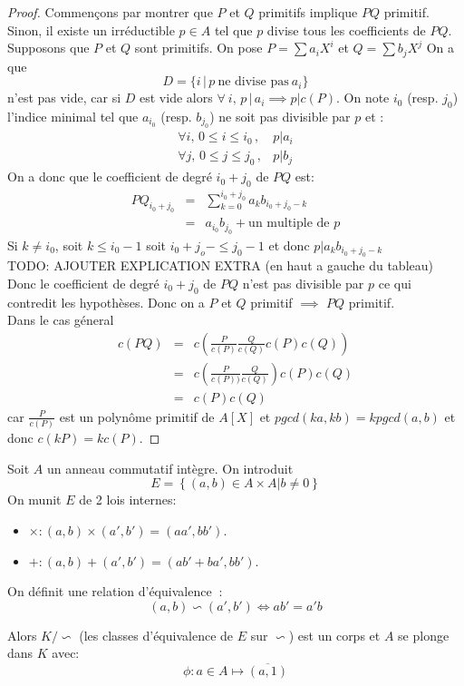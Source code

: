 \begin{proof}
	Commençons par montrer que $P$ et $Q$ primitifs implique $PQ$ primitif. \\
	Sinon, il existe un irréductible $p \in A $ tel que $p$ divise tous les coefficients de $PQ$. \\

	Supposons que $P$ et $Q$ sont primitifs. On pose $P = \sum a_iX^i$ et  $Q = \sum b_jX^j$
	On a que $$D = \{i \,|\, p\  \text{ne divise pas}\  a_i \}$$ n'est pas vide, car si $D$ est vide alors $ \forall\  i,\, p \,|\, a_i \implies p | c(P)$.
	On note $i_0$ (resp. $j_0$) l'indice minimal tel que $a_{i_0}$ (resp. $b_{j_0}$) ne soit pas divisible par $p$ et :
	\begin{eqnarray*}
		\forall i, \, 0 \leq i \leq i_0\,,& p | a_i \\
		\forall j, \, 0 \leq j \leq j_0\,,& p | b_j
	\end{eqnarray*}
	On a donc que le coefficient de degré $i_0 + j_0$ de $PQ$ est:
	\begin{eqnarray*}
		PQ_{i_0+j_0}&=& \sum\limits^{i_0 + j_0}_{k=0} a_k b_{i_0 + j_0 - k} \\
		&=& a_{i_0}b_{j_0} + \text{un multiple de } p
	\end{eqnarray*}
	Si $k \neq i_0$, soit  $k\leq i_0 -1$ soit $i_0+j_o - \leq j_0 -1$ et donc $ p | a_kb_{i_0 + j_0 - k}$\\
	TODO: AJOUTER EXPLICATION EXTRA (en haut a gauche du tableau) \\

	Donc le coefficient de degré $i_0+j_0$ de $PQ$ n'est pas divisible par $p$ ce qui contredit les hypothèses.
	Donc on a $P$ et $Q$ primitif $\implies$ $PQ$ primitif. \\
	Dans le cas géneral
	\begin{eqnarray*}
		c(PQ) &=& c\left(\frac{P}{c(P)}\frac{Q}{c(Q)}c(P)c(Q)\right)\\
		&=& c\left(\frac{P}{c(P))}\frac{Q}{c(Q)}\right)c(P)c(Q)\\
		&=& c(P)c(Q)
	\end{eqnarray*}
	car $\frac{P}{c(P)}$ est un polynôme primitif de $A[X]$ et
	$pgcd(ka, kb) = k pgcd(a,b)$ et donc $c(kP) = kc(P)$.
\end{proof}


\begin{definition}
	Soit $A$ un anneau  commutatif intègre.
	On introduit
	$$E = \left\{ (a,b) \in A\times A | b \neq 0 \right\}$$
	On munit  $E$ de 2 lois internes:
	\begin{itemize}
		\item $\times : (a,b) \times (a', b') = (aa',bb')$.
		\item $+ : (a,b) + (a', b') = (ab' + ba',bb')$.
	\end{itemize}

	On définit une relation d'équivalence $~$:
	$$ (a,b) \backsim  (a',b') \iff ab' = a'b $$

	Alors $K/\backsim $ (les classes d'équivalence de $E$ sur $\backsim$) est un corps et $A$ se plonge dans $K$ avec:
	$$\phi : a \in A  \mapsto \overline{(a,1)}$$
\end{definition}

